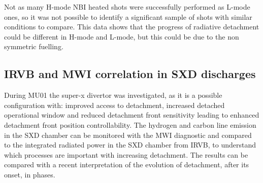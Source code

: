 Not as many H-mode NBI heated shots were successfully performed as L-mode ones, so it was not possible to identify a significant sample of shots with similar conditions to compare. This data shows that the progress of radiative detachment could be different in H-mode and L-mode, but this could be due to the non symmetric fuelling. 


\subsection{IRVB and MWI correlation in SXD discharges}\label{SXD discharges}

During MU01 the super-x divertor was investigated, as it is a possible configuration with: improved access to detachment, increased detached operational window\cite{Lipschultz2016} and reduced detachment front sensitivity leading to enhanced detachment front position controllability. The hydrogen and carbon line emission in the SXD chamber can be monitored with the MWI diagnostic and compared to the integrated radiated power in the SXD chamber from IRVB, to understand which processes are important with increasing detachment. The results can be compared with a recent interpretation of the evolution of detachment, after its onset, in phases.\cite{Verhaegh2022}

